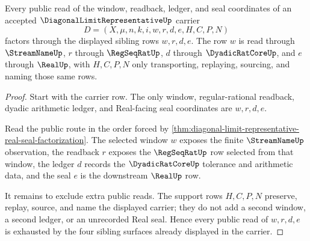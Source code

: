 \begin{theorem}
\label{thm:diagonal-limit-representative-window-ledger-exhaustion}
Every public read of the window, readback, ledger, and seal coordinates of an accepted $\DiagonalLimitRepresentativeUp$ carrier
$$
D=(X,\mu,n,k,i,w,r,d,e,H,C,P,N)
$$
factors through the displayed sibling rows $w,r,d,e$. The row $w$ is read through $\StreamNameUp$, $r$ through $\RegSeqRatUp$, $d$ through $\DyadicRatCoreUp$, and $e$ through $\RealUp$, with $H,C,P,N$ only transporting, replaying, sourcing, and naming those same rows.
\end{theorem}
\begin{proof}
Start with the carrier row. The only window, regular-rational readback, dyadic arithmetic ledger, and Real-facing seal coordinates are $w,r,d,e$.

Read the public route in the order forced by \autoref{thm:diagonal-limit-representative-real-seal-factorization}. The selected window $w$ exposes the finite $\StreamNameUp$ observation, the readback $r$ exposes the $\RegSeqRatUp$ row selected from that window, the ledger $d$ records the $\DyadicRatCoreUp$ tolerance and arithmetic data, and the seal $e$ is the downstream $\RealUp$ row.

It remains to exclude extra public reads. The support rows $H,C,P,N$ preserve, replay, source, and name the displayed carrier; they do not add a second window, a second ledger, or an unrecorded Real seal. Hence every public read of $w,r,d,e$ is exhausted by the four sibling surfaces already displayed in the carrier.
\end{proof}

